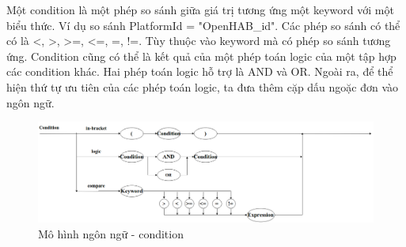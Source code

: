 




Một condition là một phép so sánh giữa giá trị tương ứng một keyword với một biểu thức. Ví dụ so sánh PlatformId = "OpenHAB\_id". Các phép so sánh có thể có là <, >, >=, <=, =, !=. Tùy thuộc vào keyword mà có phép so sánh tương ứng. Condition cũng có thể là kết quả của một phép toán logic của một tập hợp các condition khác. Hai phép toán logic hỗ trợ là AND và OR. Ngoài ra, để thể hiện thứ tự ưu tiên của các phép toán logic, ta đưa thêm cặp dấu ngoặc đơn vào ngôn ngữ.

\begin{figure}[h!]
	\center
	\includegraphics[scale=0.3]{image/language_model-condition}
	\caption{Mô hình ngôn ngữ - condition}
\end{figure}




